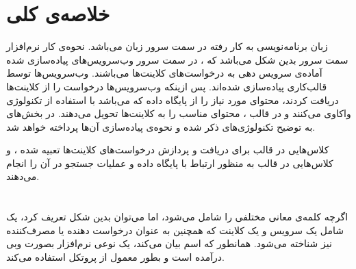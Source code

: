 \documentclass[oneside]{report}
\begin{document}
   \section{خلاصه‌ی کلی}                
  زبان برنامه‌نویسی به کار رفته در سمت سرور زبان
  {\normalsize{}}
  می‌باشد.
  نحوه‌ی کار نرم‌افزار سمت سرور بدین شکل می‌باشد که ، در سمت سرور وب‌سرویس‌های پیاده‌سازی شده 
  آماده‌ی سرویس دهی به درخواست‌های کلاینت‌ها می‌باشند. وب‌سرویس‌ها توسط قالب‌کاری 
           {\normalsize {}} 
   پیاده‌سازی شده‌اند. پس ازینکه وب‌سرویس‌ها درخواست را از کلاینت‌ها دریافت کردند، 
   محتوای مورد نیاز را از پایگاه داده که 
            {\normalsize {}} 
            می‌باشد با استفاده از تکنولوژی                                     
                     {\normalsize {}} 
واکاوی می‌کنند و در قالب
         {\normalsize {}} 
        ، محتوای مناسب را به کلاینت‌ها تحویل می‌دهند. 
		در بخش‌های به توضیح تکنولوژی‌های ذکر شده و نحوه‌ی پیاده‌سازی آن‌ها پرداخته خواهد شد.
		
		کلاس‌هایی در قالب 
		{\normalsize{}}
		برای دریافت و پردازش درخواست‌های کلاینت‌ها تعبیه شده ، و کلاس‌هایی در قالب
		{\normalsize{}}
		به منظور ارتباط با پایگاه داده و عملیات جستجو در آن‌ را انجام می‌دهند. 
		
	\section{{\large{}}}
اگرچه کلمه‌ی 
{\normalsize{}}
معانی مختلفی را شامل می‌شود، اما می‌توان بدین شکل تعریف کرد، یک 
{\normalsize{}}
شامل یک سرویس و یک کلاینت که همچنین به عنوان درخواست دهنده یا مصرف‌کننده نیز شناخته می‌شود. همانطور که  اسم 
{\normalsize{}}
بیان می‌کند، یک 
{\normalsize{}}
نوعی نرم‌افزار بصورت وبی درآمده است و بطور معمول از پروتکل 
{\normalsize{}}
استفاده می‌کند. 
		
\end{document}
